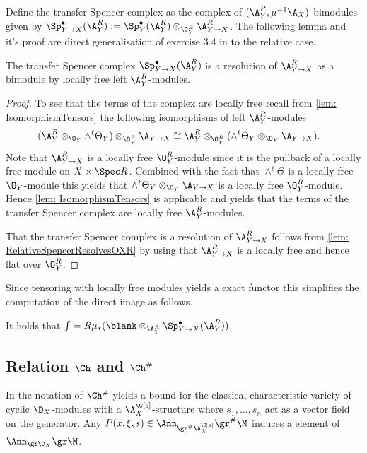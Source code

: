 Define the transfer Spencer complex as the complex of  $(\A_Y^R,\mu^{-1}\A_X)$-bimodules given by $\Sp^\bullet_{Y\to X}(\A_Y^R) := \Sp^\bullet_Y(\A_Y^R) \otimes_{\O_Y^R}\A_{Y \to X}^R$.
The following lemma and it's proof are direct generalisation of exercise 3.4 in \cite{sabbah2011introduction} to the relative case.
\begin{lemma}\label{lem: SpencerResolutionTransferModule}
  The transfer Spencer complex $\Sp^\bullet_{Y\to X}(\A_Y^R)$ is a resolution of $\A_{Y\to X}^R$ as a bimodule by locally free left $\A_Y^R$-modules.
\end{lemma}
\begin{proof}
   To see that the terms of the complex are locally free recall from \cref{lem: IsomorphismTensors} the following isomorphisms of left $\A_Y^R$-modules
    \begin{align*}
       (\A_Y^R \otimes_{\O_Y} \wedge^\ell\Theta_Y )\otimes_{\O_Y^R}\A_{Y\to X} &
       \cong \A_Y^R \otimes_{\O_Y^R}(  \wedge^\ell\Theta_Y \otimes_{\O_Y}\A_{Y\to X}).
    \end{align*}
  Note that $\A_{Y\to X}^R$ is a locally free $\O_Y^R$-module since it is the pullback of a locally free module on $X\times \Spec R$.
  Combined with the fact that $\wedge^\ell \Theta$ is a locally free $\O_Y$-module this yields that $ \wedge^\ell\Theta_Y \otimes_{\O_Y}\A_{Y\to X}$ is a locally free $\O_Y^R$-module.
  Hence \cref{lem: IsomorphismTensors} is applicable and yields that the terms of the transfer Spencer complex are locally free $\A_Y^R$-modules.

  That the transfer Spencer complex is a resolution of $\A_{Y\to X}^R$ follows from \cref{lem: RelativeSpencerResolvesOXR} by using that $\A_{Y\to X}^R$ is a locally free and hence flat over $\O_Y^R$.
\end{proof}


Since tensoring with locally free modules yields a exact functor this simplifies the computation of the direct image as follows.
\begin{corollary}
    It holds that $\int = R\mu_* (\blank\otimes_{\A_Y^R} \Sp_{Y\to X}^\bullet(\A_Y^R))$.
\end{corollary}

\subsection{Relation $\Ch$ and $\Ch^\#$}
In the notation of \cite{budur2020zero} $\Ch^\#$ yields a bound for the classical characteristic variety of cyclic $\D_X$-modules with a $\A_X^{\C[s]}$-structure where $s_1, \ldots, s_n$ act as a vector field on the generator.
Any $P(x,\xi, s) \in \Ann_{\gr^\#\A_X^{\C[s]}} \gr^\# \M$ induces a element of $\Ann_{\gr \D_X} \gr \M$.

